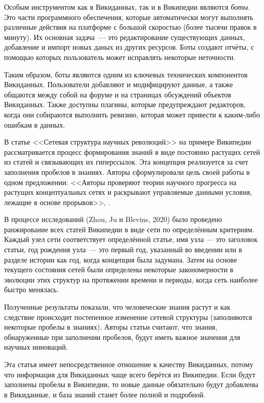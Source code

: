 Особым инструментом как в Викиданных, так и в Википедии являются \textit{боты}\footnotemark.  Это части программного обеспечения, которые автоматически могут выполнять различные действия на платформе с большой скоростью (более тысячи правок в минуту). Их основная задача~--- это редактирование существующих данных, добавление и импорт новых даных из других ресурсов. Боты создают отчёты, с помощью которых пользователь может исправлять некоторые неточности. 

Таким образом, боты являются одним из ключевых технических компонентов Викиданных. Пользователи добавляют и модифицируют данные, а также общаются между собой на форуме и на страницах обсуждений объектов Викиданных. Также доступны плагины, которые предупреждают редакторов, когда они собираются выполнить ревизию, которая может привести к каким-либо ошибкам в данных.

В статье <<Сетевая структура научных революций>>\autocite{Network_structure_revolutions} на примере Википедии рассматривается процесс формирования знаний в виде постоянно растущих сетей из статей и связывающих их гиперссылок. Эта концепция реализуется за счет заполнения пробелов в знаниях. Авторы сформулировали цель своей работы в одном предложении: <<Авторы проверяют теории научного прогресса на растущих концептуальных сетях и раскрывают управляемые данными условия, лежащие в основе прорывов>>\footnotemark, \autocite{Network_structure_revolutions}.

В процессе исследований (Zhou, Ju и Blevins, 2020)\autocite{Network_structure_revolutions}  было проведено ранжирование всех статей Википедии в виде сети по определённым критериям. Каждый узел сети соответствует определённой статье, имя узла --- это заголовок статьи, год рождения узла~--- это первый год, указанный во введении или в разделе истории как год, когда концепция была задумана. Затем на основе текущего состояния сетей были определены некоторые закономерности в эволюции этих структур на протяжении времени и периоды, когда сеть наиболее быстро менялась.

Полученные результаты показали, что человеческие знания растут и как следствие происходит постепенное изменение сетевой структуры (заполняются некоторые пробелы в знаниях). Авторы статьи\autocite{Network_structure_revolutions} считают, что знания, обнаруженные при заполнении пробелов, будут иметь важное значения для научных инноваций. 

Эта статья имеет непосредственное отношение к качеству Викиданных, потому что информация для Викиданных чаще всего берётся из Википедии. Если будут заполнены пробелы в Википедии, то новые данные обязательно будут добавлены в Викиданные, и база знаний станет более полной и подробной.
